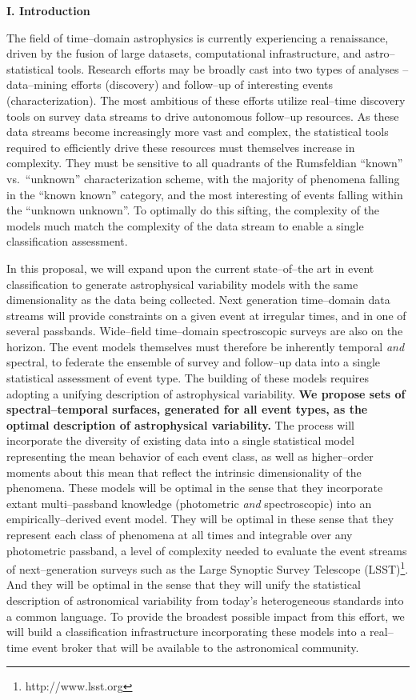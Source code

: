 \centerline{\bf I. Introduction} \smallskip

The field of time--domain astrophysics is currently experiencing a renaissance,
driven by the fusion of large datasets, computational infrastructure, and
astro--statistical tools.  Research efforts may be broadly cast into two types
of analyses -- data--mining efforts (discovery) and follow--up of interesting
events (characterization).  The most ambitious of these efforts utilize
real--time discovery tools on survey data streams to drive autonomous follow--up
resources. As these data streams become increasingly more vast and complex, the
statistical tools required to efficiently drive these resources must themselves
increase in complexity.  They must be sensitive to all quadrants of the
Rumsfeldian ``known'' vs.\ ``unknown'' characterization scheme, with the
majority of phenomena falling in the ``known known'' category, and the most
interesting of events falling within the ``unknown unknown''.  To optimally do
this sifting, the complexity of the models much match the complexity of the data
stream to enable a single classification assessment.

In this proposal, we will expand upon the current state--of--the art in event
classification to generate astrophysical variability models with the same
dimensionality as the data being collected. Next generation time--domain data
streams will provide constraints on a given event at irregular times, and in one
of several passbands.  Wide--field time--domain spectroscopic surveys are also
on the horizon.  The event models themselves must therefore be inherently
temporal {\it and} spectral, to federate the ensemble of survey and follow--up
data into a single statistical assessment of event type.  The building of these
models requires adopting a unifying description of astrophysical variability.
{\bf We propose sets of spectral--temporal surfaces, generated for all event
types, as the optimal description of astrophysical variability.}  The process
will incorporate the diversity of existing data into a single statistical model
representing the mean behavior of each event class, as well as higher--order
moments about this mean that reflect the intrinsic dimensionality of the
phenomena.  These models will be optimal in the sense that they incorporate
extant multi--passband knowledge (photometric {\it and} spectroscopic) into an
empirically--derived event model. They will be optimal in these sense that they
represent each class of phenomena at all times and integrable over any
photometric passband, a level of complexity needed to evaluate the event streams
of next--generation surveys such as the Large Synoptic Survey Telescope
(LSST)\footnote{http://www.lsst.org}. And they will be optimal in the sense that
they will unify the statistical description of astronomical variability from
today's heterogeneous standards into a common language.  To provide the broadest
possible impact from this effort, we will build a classification infrastructure
incorporating these models into a real--time event broker that will be available
to the astronomical community.



